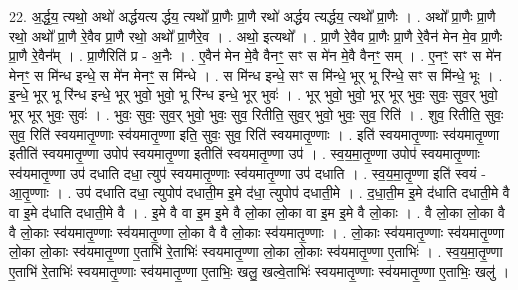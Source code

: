\documentclass[17pt]{extarticle}
\begin{document}
22. अ॒र्द्ध॒य॒ त्यथो॒ अथो॑ अर्द्धयत्य र्द्धय॒ त्यथो᳚ प्रा॒णैः प्रा॒णै रथो॑ अर्द्धय त्यर्द्धय॒ त्यथो᳚ प्रा॒णैः । . अथो᳚ प्रा॒णैः प्रा॒णै रथो॒ अथो᳚ प्रा॒णै रे॒वैव प्रा॒णै रथो॒ अथो᳚ प्रा॒णैरे॒व । . अथो॒ इत्यथो᳚ । . प्रा॒णै रे॒वैव प्रा॒णैः प्रा॒णै रे॒वैन॑ मेन मे॒व प्रा॒णैः प्रा॒णै रे॒वैन᳚म् । . प्रा॒णैरिति॑ प्र - अ॒नैः । . ए॒वैन॑ मेन मे॒वै वैनꣳ॒॒ सꣳ स मे॑न मे॒वै वैनꣳ॒॒ सम् । . ए॒नꣳ॒॒ सꣳ स मे॑न मेनꣳ॒॒ स मि॑न्ध इन्धे॒ स मे॑न मेनꣳ॒॒ स मि॑न्धे । . स मि॑न्ध इन्धे॒ सꣳ स मि॑न्धे॒ भूर् भू रि॑न्धे॒ सꣳ स मि॑न्धे॒ भूः । . इ॒न्धे॒ भूर् भू रि॑न्ध इन्धे॒ भूर् भुवो॒ भुवो॒ भू रि॑न्ध इन्धे॒ भूर् भुवः॑ । . भूर् भुवो॒ भुवो॒ भूर् भूर् भुवः॒ सुवः॒ सुव॒र् भुवो॒ भूर् भूर् भुवः॒ सुवः॑ । . भुवः॒ सुवः॒ सुव॒र् भुवो॒ भुवः॒ सुव॒ रितीति॒ सुव॒र् भुवो॒ भुवः॒ सुव॒ रिति॑ । . शुव॒ रितीति॒ सुवः॒ सुव॒ रिति॑ स्वयमातृ॒ण्णाः स्व॑यमातृ॒ण्णा इति॒ सुवः॒ सुव॒ रिति॑ स्वयमातृ॒ण्णाः । . इति॑ स्वयमातृ॒ण्णाः स्व॑यमातृ॒ण्णा इतीति॑ स्वयमातृ॒ण्णा उपोप॑ स्वयमातृ॒ण्णा इतीति॑ स्वयमातृ॒ण्णा उप॑ । . स्व॒य॒मा॒तृ॒ण्णा उपोप॑ स्वयमातृ॒ण्णाः स्व॑यमातृ॒ण्णा उप॑ दधाति दधा॒ त्युप॑ स्वयमातृ॒ण्णाः स्व॑यमातृ॒ण्णा उप॑ दधाति । . स्व॒य॒मा॒तृ॒ण्णा इति॑ स्वयं - आ॒तृ॒ण्णाः । . उप॑ दधाति दधा॒ त्युपोप॑ दधाती॒म इ॒मे द॑धा॒ त्युपोप॑ दधाती॒मे । . द॒धा॒ती॒म इ॒मे द॑धाति दधाती॒मे वै वा इ॒मे द॑धाति दधाती॒मे वै । . इ॒मे वै वा इ॒म इ॒मे वै लो॒का लो॒का वा इ॒म इ॒मे वै लो॒काः । . वै लो॒का लो॒का वै वै लो॒काः स्व॑यमातृ॒ण्णाः स्व॑यमातृ॒ण्णा लो॒का वै वै लो॒काः स्व॑यमातृ॒ण्णाः । . लो॒काः स्व॑यमातृ॒ण्णाः स्व॑यमातृ॒ण्णा लो॒का लो॒काः स्व॑यमातृ॒ण्णा ए॒ताभि॑ रे॒ताभिः॑ स्वयमातृ॒ण्णा लो॒का लो॒काः स्व॑यमातृ॒ण्णा ए॒ताभिः॑ । . स्व॒य॒मा॒तृ॒ण्णा ए॒ताभि॑ रे॒ताभिः॑ स्वयमातृ॒ण्णाः स्व॑यमातृ॒ण्णा ए॒ताभिः॒ खलु॒ खल्वे॒ताभिः॑ स्वयमातृ॒ण्णाः स्व॑यमातृ॒ण्णा ए॒ताभिः॒ खलु॑ । \newline
\end{document}

